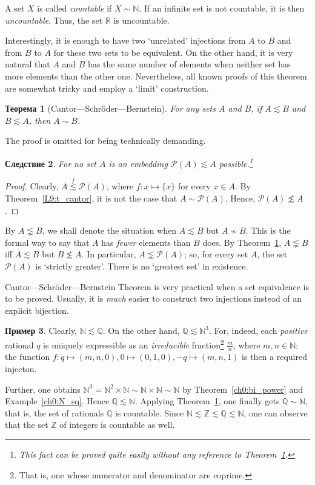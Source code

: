\documentclass[12pt,notitlepage]{article}
\theoremstyle{plain}
\newtheorem{thm}{Теорема}[section]
\newtheorem{corr}[thm]{Следствие}
\theoremstyle{definition}
\newtheorem{exm}[thm]{Пример}
\theoremstyle{plain}
\newcommand{\N}{\mathbb{N}}
\newcommand{\Z}{\mathbb{Z}}
\newcommand{\Q}{\mathbb{Q}}
\newcommand{\R}{\mathbb{R}}
\newcommand{\mP}{\mathcal{P}}
\newcommand{\1}{\mathbf{1}}
\newcommand{\0}{\mathbf{0}}
\begin{document}
A set $X$ is called \emph{countable} if $X \sim \N$. If an infinite set is not countable, it is then \emph{uncountable}. Thus, the set $\R$ is uncountable.

Interestingly, it is enough to have two `unrelated' injections from $A$ to $B$ and from $B$ to $A$ for these two sets to be equivalent. On the other hand, it is very natural that $A$ and $B$ has the same number of elements when neither set has more elements than the other one. Nevertheless, all known proofs of this theorem are somewhat tricky and employ a `limit' construction.
\begin{thm}[Cantor---Schr\"oder---Bernstein]\label{ch0:bernstein} For any sets $A$ and $B$, if $A \lesssim B$ and $B \lesssim A$, then $A \sim B$.
\end{thm}
\noindent The proof is omitted for being technically demanding.

\begin{corr}
	For no set $A$ is an embedding $\mP(A) \lesssim A$ possible.\footnote{This fact can be proved quite easily without any reference to Theorem~\ref{ch0:bernstein}.}
\end{corr}
\begin{proof}
	Clearly, $A \stackrel{f}{\lesssim} \mP(A)$, where $f\colon x \mapsto \{ x \}$ for every $x \in A$. By Theorem~\ref{L9:t_cantor}, it is not the case that $A \sim \mP(A)$. Hence, $\mP(A) \not\lesssim A$.
\end{proof}

By $A \lnsim B$, we shall denote the situation when $A \lesssim B$ but $A \nsim B$. This is the formal way to say that $A$ has \emph{fewer} elements than $B$ does. By Theorem~\ref{ch0:bernstein}, $A \lnsim B$ iff $A \lesssim B$ but  $B \not\lesssim A$. In particular, $A \lnsim \mP(A)$; so, for every set $A$, the set $\mP(A)$ is `strictly greater'. There is no `greatest set' in existence.

\medskip

Cantor---Schr\"oder---Bernstein Theorem is very practical when a set equivalence is to be proved. Usually, it is \emph{much} easier to construct two injections instead of an explicit bijection.
\begin{exm}
	Clearly, $\N \lesssim \Q$. On the other hand, $\Q \lesssim \N^3$. For, indeed, each \emph{positive} rational $q$ is uniquely expressible as an \emph{irreducible} fraction\footnote{That is, one whose numerator and denominator are coprime.} $\frac{m}{n}$, where $m, n \in \N$; the function $f\colon q \mapsto (m,n,0), 0 \mapsto (0,1,0), -q \mapsto (m,n,1)$ is then a required injecton.
	
	Further, one obtains $\N^3 = \N^2 \times \N \sim \N \times \N \sim \N$ by Theorem~\ref{ch0:bi_power} and Example~\ref{ch0:N_sq}. Hence $\Q \lesssim \N$. Applying Theorem~\ref{ch0:bernstein}, one finally gets $\Q \sim \N$, that is, the set of rationals $\Q$ is countable. Since $\N \lesssim \Z \lesssim \Q \lesssim \N$, one can observe that the set $\Z$ of integers is countable as well.
\end{exm}
\end{document}
